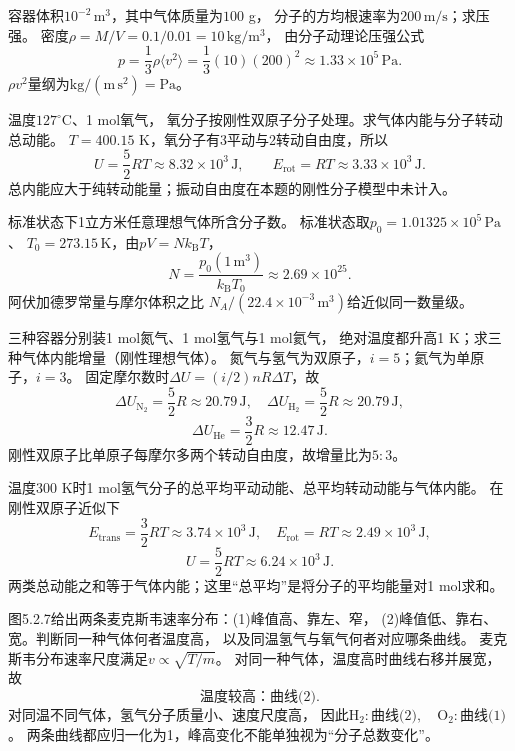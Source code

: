\problemtext 容器体积$10^{-2}\,\mathrm{m^3}$，其中气体质量为$100$ g，
分子的方均根速率为$200\,\mathrm{m/s}$；求压强。
\workings
密度$\rho=M/V=0.1/0.01=10\,\mathrm{kg/m^3}$，
由分子动理论压强公式
\[
\boxed{p=\frac13\rho\langle v^2\rangle
=\frac13(10)(200)^2
\approx1.33\times10^5\,\mathrm{Pa}}.
\]
\crosscheck $\rho v^2$量纲为$\mathrm{kg/(m\,s^2)}=\mathrm{Pa}$。

\problemtext 温度$127^\circ\mathrm C$、1 mol氧气，
氧分子按刚性双原子分子处理。求气体内能与分子转动总动能。
\workings
$T=400.15$ K，氧分子有3平动与2转动自由度，所以
\[
\boxed{U=\frac52RT
\approx8.32\times10^3\,\mathrm J},\qquad
\boxed{E_{\mathrm{rot}}=RT\approx3.33\times10^3\,\mathrm J}.
\]
\crosscheck 总内能应大于纯转动能量；振动自由度在本题的刚性分子模型中未计入。

\problemtext 标准状态下1立方米任意理想气体所含分子数。
\workings
标准状态取$p_0=1.01325\times10^5\,\mathrm{Pa}$、
$T_0=273.15\,\mathrm K$，由$pV=Nk_{\mathrm B}T$，
\[
\boxed{N=\frac{p_0(1\,\mathrm{m^3})}{k_{\mathrm B}T_0}
\approx2.69\times10^{25}}.
\]
\crosscheck 阿伏加德罗常量与摩尔体积之比
$N_A/(22.4\times10^{-3}\,\mathrm{m^3})$给近似同一数量级。

\problemtext 三种容器分别装1 mol氮气、1 mol氢气与1 mol氦气，
绝对温度都升高1 K；求三种气体内能增量（刚性理想气体）。
\workings
氮气与氢气为双原子，$i=5$；氦气为单原子，$i=3$。
固定摩尔数时$\Delta U=(i/2)nR\Delta T$，故
\[
\boxed{\Delta U_{\mathrm{N_2}}=\frac52R
\approx20.79\,\mathrm J},\quad
\boxed{\Delta U_{\mathrm{H_2}}=\frac52R
\approx20.79\,\mathrm J},
\]
\[
\boxed{\Delta U_{\mathrm{He}}=\frac32R\approx12.47\,\mathrm J}.
\]
\crosscheck 刚性双原子比单原子每摩尔多两个转动自由度，故增量比为$5:3$。

\problemtext 温度300 K时1 mol氢气分子的总平均平动动能、总平均转动动能与气体内能。
\workings
在刚性双原子近似下
\[
\boxed{E_{\mathrm{trans}}=\frac32RT\approx3.74\times10^3\,\mathrm J},\quad
\boxed{E_{\mathrm{rot}}=RT\approx2.49\times10^3\,\mathrm J},
\]
\[
\boxed{U=\frac52RT\approx6.24\times10^3\,\mathrm J}.
\]
\crosscheck 两类总动能之和等于气体内能；这里“总平均”是将分子的平均能量对1 mol求和。

\problemtext 图5.2.7给出两条麦克斯韦速率分布：(1)峰值高、靠左、窄，
(2)峰值低、靠右、宽。判断同一种气体何者温度高，
以及同温氢气与氧气何者对应哪条曲线。
\workings
麦克斯韦分布速率尺度满足$v\propto\sqrt{T/m}$。
对同一种气体，温度高时曲线右移并展宽，故
\[
\boxed{\text{温度较高：曲线(2)}}.
\]
对同温不同气体，氢气分子质量小、速度尺度高，
因此$\boxed{\mathrm{H_2}:\text{曲线(2)},\quad
\mathrm{O_2}:\text{曲线(1)}}$。
\crosscheck 两条曲线都应归一化为1，峰高变化不能单独视为“分子总数变化”。

